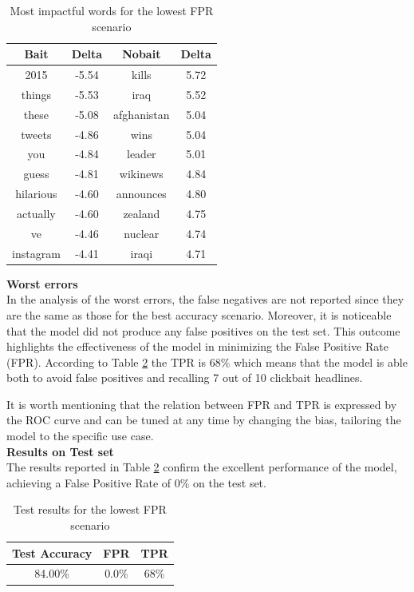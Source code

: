 \documentclass{article}
\begin{document}
\begin{multicols}{2}
\begin{table}[H]
    \begin{tabular}{|c|c|c|c|}
    \hline
    \rowcolor{pyblue!60}
    \textbf{Bait} & \textbf{Delta} & \textbf{Nobait} & \textbf{Delta}\\ \hline
    2015 & -5.54 & kills & 5.72 \\ \hline
    things & -5.53 & iraq & 5.52 \\ \hline
    these & -5.08 & afghanistan & 5.04 \\ \hline
    tweets & -4.86 & wins & 5.04 \\ \hline
    you & -4.84 & leader & 5.01 \\ \hline
    guess & -4.81 & wikinews & 4.84 \\ \hline
    hilarious & -4.60 & announces & 4.80 \\ \hline
    actually & -4.60 & zealand & 4.75 \\ \hline
    ve & -4.46 & nuclear & 4.74 \\ \hline
    instagram & -4.41 & iraqi & 4.71 \\ \hline
    \end{tabular}
    \caption{\footnotesize Most impactful words for the lowest FPR scenario}
    \label{tab:MIW_fpr_scenario}
    \end{table}

\noindent
\textbf{Worst errors} \\
\noindent
In the analysis of the worst errors, the false negatives are not reported since they are the same as those for the 
best accuracy scenario. Moreover, it is noticeable that the model did not produce any false positives on 
the test set. This outcome highlights the effectiveness of the model in minimizing the False Positive Rate 
(FPR). According to Table \ref{tab:low_fpr_scenario} the TPR is 68\% which means that the model is able both to
avoid false positives and recalling 7 out of 10 clickbait headlines.

It is worth mentioning that the relation between FPR and TPR is expressed by the ROC curve and can be tuned
at any time by changing the bias, tailoring the model to the specific use case.
\\

\noindent
\textbf{Results on Test set}\\
The results reported in Table \ref{tab:low_fpr_scenario} confirm the excellent performance of the model,
achieving a False Positive Rate of 0\% on the test set.

    \begin{table}[H]
        \small
        \centering
        \begin{tabular}{|c|c|c|}
        \hline
        \rowcolor{pyblue!60}
        \textbf{Test Accuracy} & \textbf{FPR} & \textbf{TPR}\\ \hline
        84.00\% & 0.0\% & 68\%\\ \hline
        \end{tabular}
        \caption{\footnotesize Test results for the lowest FPR scenario}
        \label{tab:low_fpr_scenario}
    \end{table}



\end{multicols}
\end{document}
